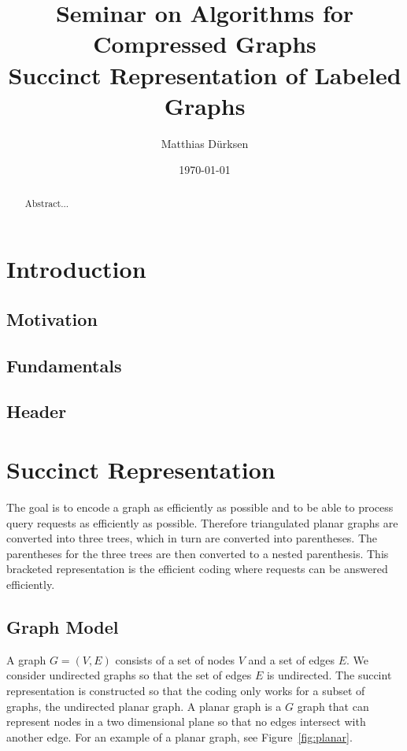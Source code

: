 \documentclass[a4paper]{scrartcl}
\title{Seminar on Algorithms for Compressed Graphs \\ Succinct Representation of Labeled Graphs}
\author{Matthias Dürksen}
\date{\today}
\begin{document}
\maketitle

\begin{abstract}
	Abstract...
\end{abstract}


\section{Introduction}\label{sec:introduction}

\subsection{Motivation}

\subsection{Fundamentals}

\subsection{Header}





\section{Succinct Representation}
The goal is to encode a graph as efficiently as possible and to be able to process query requests as efficiently as possible. Therefore triangulated planar graphs are converted into three trees, which in turn are converted into parentheses. The parentheses for the three trees are then converted to a nested parenthesis. This bracketed representation is the efficient coding where requests can be answered efficiently.





\subsection{Graph Model}
A graph $G=(V,E)$ consists of a set of nodes $V$ and a set of edges $E$. We consider undirected graphs so that the set of edges $E$ is undirected.
The succint representation is constructed so that the coding only works for a subset of graphs, the undirected planar graph. A planar graph is a $G$ graph that can represent nodes in a two dimensional plane so that no edges intersect with another edge. For an example of a planar graph, see Figure~\ref{fig:planar}.
\end{document}
